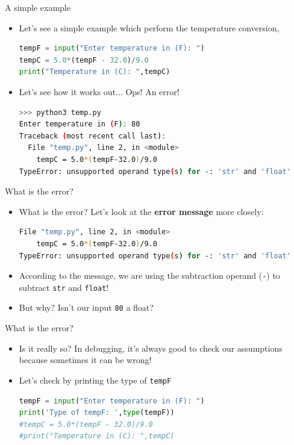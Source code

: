 \documentclass[10pt,xcolor={table,dvipsnames},t]{beamer}
\begin{document}
\begin{frame}[fragile]{A simple example}
  \begin{itemize}
    \item Let's see a simple example which perform the temperature conversion,
\begin{lstlisting}[language=python]
tempF = input("Enter temperature in (F): ")
tempC = 5.0*(tempF - 32.0)/9.0
print("Temperature in (C): ",tempC)
\end{lstlisting}
  \item Let's see how it works out... Ops! An error!
\begin{lstlisting}[language=bash]
>>> python3 temp.py
Enter temperature in (F): 80
Traceback (most recent call last):
  File "temp.py", line 2, in <module>
    tempC = 5.0*(tempF-32.0)/9.0
TypeError: unsupported operand type(s) for -: 'str' and 'float'
\end{lstlisting}
  \end{itemize}
\end{frame}

\begin{frame}[fragile]{What is the error?}
  \begin{itemize}
    \item What is the error? Let's look at the \textbf{error message} more closely:
  \begin{lstlisting}[language=bash]
    File "temp.py", line 2, in <module>
    tempC = 5.0*(tempF-32.0)/9.0
TypeError: unsupported operand type(s) for -: 'str' and 'float'
\end{lstlisting}
  \item According to the message, we are using the subtraction operand (\texttt{-}) to subtract \texttt{str} and \texttt{float}!
  \item But why? Isn't our input \texttt{80} a float?
  \end{itemize}
\end{frame}

\begin{frame}[fragile]{What is the error?}
  \begin{itemize}
    \item  Is it really so? In debugging, it's always good to check our assumptions because sometimes it can be wrong!
    \item Let's check by printing the type of \texttt{tempF}
\begin{lstlisting}[language=python]
tempF = input("Enter temperature in (F): ")
print('Type of tempF: ',type(tempF))
#tempC = 5.0*(tempF - 32.0)/9.0
#print("Temperature in (C): ",tempC)
\end{lstlisting}
  \end{itemize}
\end{frame}
\end{document}
